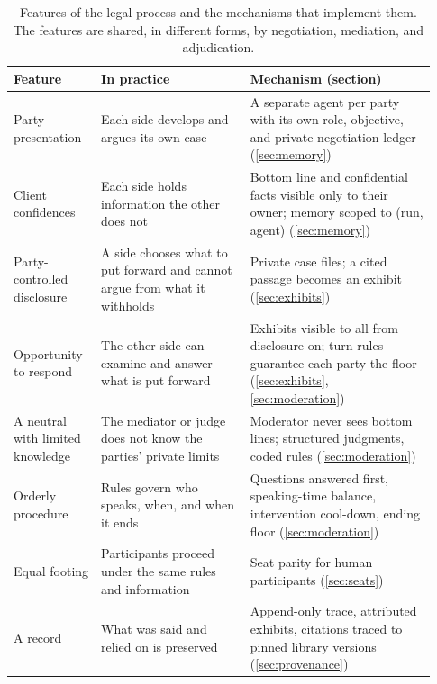 \documentclass[acmsmall,screen,review]{acmart}
\begin{document}
\begin{table}[t]
\caption{Features of the legal process and the mechanisms that implement them. The features are shared, in different forms, by negotiation, mediation, and adjudication.}
\label{tab:process}
\small
\begin{tabular}{@{}>{\raggedright\arraybackslash}p{0.19\linewidth}>{\raggedright\arraybackslash}p{0.33\linewidth}>{\raggedright\arraybackslash}p{0.41\linewidth}@{}}
\toprule
Feature & In practice & Mechanism (section) \\
\midrule
Party presentation & Each side develops and argues its own case & A separate agent per party with its own role, objective, and private negotiation ledger (\ref{sec:memory}) \\
Client confidences & Each side holds information the other does not & Bottom line and confidential facts visible only to their owner; memory scoped to (run, agent) (\ref{sec:memory}) \\
Party-controlled disclosure & A side chooses what to put forward and cannot argue from what it withholds & Private case files; a cited passage becomes an exhibit (\ref{sec:exhibits}) \\
Opportunity to respond & The other side can examine and answer what is put forward & Exhibits visible to all from disclosure on; turn rules guarantee each party the floor (\ref{sec:exhibits}, \ref{sec:moderation}) \\
A neutral with limited knowledge & The mediator or judge does not know the parties' private limits & Moderator never sees bottom lines; structured judgments, coded rules (\ref{sec:moderation}) \\
Orderly procedure & Rules govern who speaks, when, and when it ends & Questions answered first, speaking-time balance, intervention cool-down, ending floor (\ref{sec:moderation}) \\
Equal footing & Participants proceed under the same rules and information & Seat parity for human participants (\ref{sec:seats}) \\
A record & What was said and relied on is preserved & Append-only trace, attributed exhibits, citations traced to pinned library versions (\ref{sec:provenance}) \\
\bottomrule
\end{tabular}
\end{table}
\end{document}
